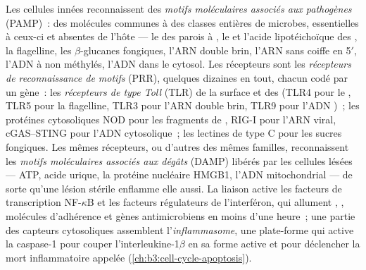 \begin{definition}\label{def:b3:innate-immunity:prr}
Les cellules innées reconnaissent des \emph{motifs moléculaires associés
aux pathogènes} (PAMP)~: des molécules communes à des classes entières
de microbes, essentielles à ceux-ci et absentes de l'hôte --- le
 des parois à , le  et
l'acide lipotéichoïque des , la flagelline, les
$\beta$-glucanes fongiques, l'ARN double brin, l'ARN sans coiffe en
5$'$, l'ADN à  non méthylés, l'ADN dans le cytosol. Les récepteurs
sont les \emph{récepteurs de reconnaissance de motifs} (PRR), quelques
dizaines en tout, chacun codé par un gène~: les \emph{récepteurs de type
Toll} (TLR) de la surface et des  (TLR4 pour le
, TLR5 pour la flagelline, TLR3 pour l'ARN double
brin, TLR9 pour l'ADN )~; les protéines cytosoliques NOD pour les
fragments de , RIG-I pour l'ARN viral, cGAS--STING pour
l'ADN cytosolique~; les lectines de type C pour les sucres fongiques.
Les mêmes récepteurs, ou d'autres des mêmes familles, reconnaissent les
\emph{motifs moléculaires associés aux dégâts} (DAMP) libérés par les
cellules lésées --- ATP, acide urique, la protéine nucléaire HMGB1,
l'ADN mitochondrial --- de sorte qu'une lésion stérile enflamme elle
aussi. La liaison active les facteurs de transcription NF-$\kappa$B et
les facteurs régulateurs de l'interféron, qui allument ,
, molécules d'adhérence et gènes antimicrobiens en moins
d'une heure~; une partie des capteurs cytosoliques assemblent
l'\emph{inflammasome}, une plate-forme qui active la caspase-1 pour
couper l'interleukine-1$\beta$ en sa forme active et pour déclencher la
mort inflammatoire appelée  (\cref{ch:b3:cell-cycle-apoptosis}).
\end{definition}

